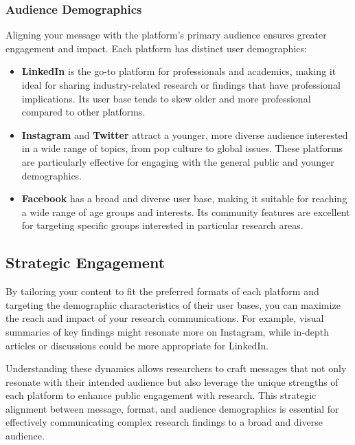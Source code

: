 \documentclass[
]{book}
\providecommand{\tightlist}{%
  \setlength{\itemsep}{0pt}\setlength{\parskip}{0pt}}
\begin{document}
\hypertarget{audience-demographics}{%
\subsubsection*{Audience Demographics}\label{audience-demographics}}

Aligning your message with the platform's primary audience ensures greater engagement and impact. Each platform has distinct user demographics:

\begin{itemize}
\tightlist
\item
  \textbf{LinkedIn} is the go-to platform for professionals and academics, making it ideal for sharing industry-related research or findings that have professional implications. Its user base tends to skew older and more professional compared to other platforms.
\item
  \textbf{Instagram} and \textbf{Twitter} attract a younger, more diverse audience interested in a wide range of topics, from pop culture to global issues. These platforms are particularly effective for engaging with the general public and younger demographics.
\item
  \textbf{Facebook} has a broad and diverse user base, making it suitable for reaching a wide range of age groups and interests. Its community features are excellent for targeting specific groups interested in particular research areas.
\end{itemize}

\hypertarget{strategic-engagement}{%
\subsection*{Strategic Engagement}\label{strategic-engagement}}

By tailoring your content to fit the preferred formats of each platform and targeting the demographic characteristics of their user bases, you can maximize the reach and impact of your research communications. For example, visual summaries of key findings might resonate more on Instagram, while in-depth articles or discussions could be more appropriate for LinkedIn.

Understanding these dynamics allows researchers to craft messages that not only resonate with their intended audience but also leverage the unique strengths of each platform to enhance public engagement with research. This strategic alignment between message, format, and audience demographics is essential for effectively communicating complex research findings to a broad and diverse audience.
\end{document}
